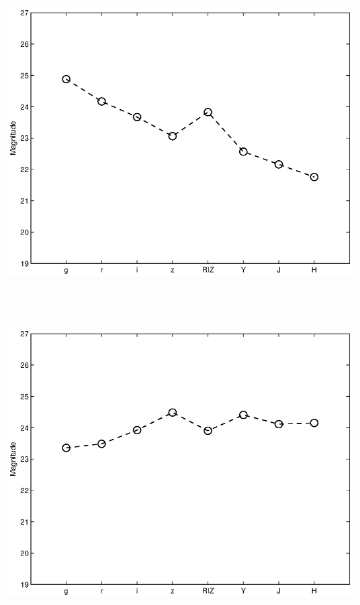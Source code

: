 \documentclass[useAMS,usenatbib,fleqn]{mn2e}
\begin{document}
\begin{figure}
        \centering
        
        \begin{subfigure}[b]{0.175\textwidth}
                \includegraphics[width=\textwidth]{figures/basis_01.eps}
        \end{subfigure}
	~
        \begin{subfigure}[b]{0.175\textwidth}
                \includegraphics[width=\textwidth]{figures/basis_02.eps}
        \end{subfigure}
        ~
        \begin{subfigure}[b]{0.175\textwidth}

\end{subfigure}
\end{figure}
\end{document}
